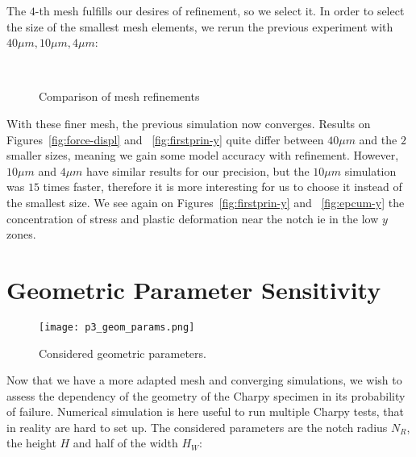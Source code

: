 \documentclass[
10pt, %
a4paper, %
oneside, %
headinclude,footinclude, %
BCOR5mm, %
]{scrartcl}
\begin{document}
The $4$-th mesh fulfills our desires of refinement, so we select it.
In order to select the size of the smallest mesh elements, we rerun the
previous experiment with $40 \mu m, 10 \mu m, 4 \mu m$:

\begin{figure}[ht]
    \centering
    \hfill
    \\
    \hfill
    \caption{Comparison of mesh refinements}
    \label{fig:res_exp_refine}
\end{figure}

With these finer mesh, the previous simulation now converges.
Results on Figures~\ref{fig:force-displ} and ~\ref{fig:firstprin-y} quite differ between $40 \mu m$
and the $2$ smaller sizes, meaning we gain some model accuracy with refinement.
However, $10 \mu m$ and $4 \mu m$ have similar results for our precision,
but the $10 \mu m$ simulation was $15$ times faster, therefore it is
more interesting for us to choose it instead of the smallest size.
We see again on Figures~\ref{fig:firstprin-y} and ~\ref{fig:epcum-y} the concentration
of stress and plastic deformation near the notch ie in the low $y$ zones.

\section{Geometric Parameter Sensitivity}

\begin{wrapfigure}{r}{0.5\textwidth}
    \centering
    \texttt{[image: p3\_geom\_params.png]}
    \caption{Considered geometric parameters.}
\end{wrapfigure}

Now that we have a more adapted mesh and converging simulations,
we wish to assess the dependency of the geometry of the Charpy specimen
in its probability of failure. Numerical simulation is here useful
to run multiple Charpy tests, that in reality are hard to set up.
The considered parameters are the notch radius $N_R$, the height $H$
and half of the width $H_W$:
\end{document}
